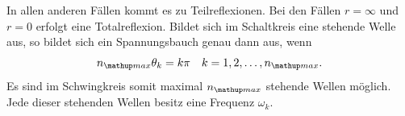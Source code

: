 In allen anderen Fällen kommt es zu Teilreflexionen.
Bei den Fällen $r=\infty$ und $r=0$ erfolgt eine Totalreflexion.
Bildet sich im Schaltkreis eine stehende Welle aus, so bildet sich ein Spannungsbauch
genau dann aus, wenn %
\begin{equation}
\label{eq:spannungsbauch}
n\ua{max}\theta_k=k\pi \quad k=1,2,\dots,n\ua{max}.
\end{equation}
Es sind im Schwingkreis somit maximal $n\ua{max}$ stehende Wellen möglich. %
Jede dieser stehenden Wellen besitz eine Frequenz $\omega_k$. %
